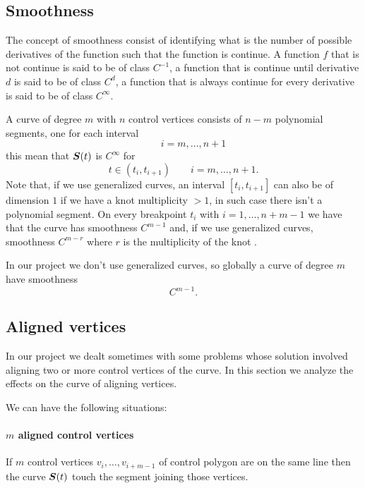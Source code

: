 \documentclass[dissertation.tex]{subfiles}
\begin{document}
\subsection{Smoothness}\label{sec:smoothness}
The concept of smoothness consist of identifying what is the number of
possible derivatives of the function such that the function is
continue. A function $f$ that is not continue is said to be of class
$C^{-1}$, a function that is continue until derivative $d$ is said to
be of class $C^d$, a function that is always continue for every
derivative is said to be of class $C^\infty$.

A \bs curve of degree $m$ with $n$ control vertices consists of
$n-m$ polynomial segments, one for each 
interval 
\begin{equation*}
[t_i,t_{i+1}]\qquad i=m,\dots,n+1  
\end{equation*}
this mean that $\boldsymbol{S}(t)$ is $C^\infty$ for
\begin{equation*}
t\in(t_i,t_{i+1})\qquad i=m,\dots,n+1.
\end{equation*}
Note that, if we use generalized \bs curves, an interval
$[t_i,t_{i+1}]$ can also be of dimension $1$ if
we have a knot multiplicity $>1$, in
such case there isn't a polynomial segment.
On every breakpoint $t_i$ with $i=1,\dots,n+m-1$ we have that the curve has
smoothness $C^{m-1}$
and, if we use generalized \bs curves, smoothness $C^{m-r}$ where $r$ is the
multiplicity of the knot \cite{farin}.

In our project we don't use generalized \bs curves, so globally a
curve of degree $m$ have smoothness
\begin{equation*}
  C^{m-1}.
\end{equation*}

\subsection{Aligned vertices}\label{sec:alignedVertices}
In our project we dealt sometimes with some problems whose solution
involved aligning two or more control vertices of the curve. In this
section we analyze the effects on the curve of aligning vertices.

We can have the following situations:
\paragraph{$m$ aligned control vertices}
If $m$ control vertices $v_i,\dots,v_{i+m-1}$ of control polygon are on the same line then
the curve $\boldsymbol{S}(t)$ touch the segment joining those vertices.
\end{document}
